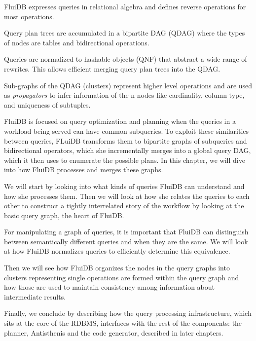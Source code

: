 
\begin{summary}
\item FluiDB expresses queries in relational algebra and defines
  reverse operations for most operations.
\item Query plan trees are accumulated in a bipartite DAG (QDAG) where
  the types of nodes are tables and bidirectional operations.
\item Queries are normalized to hashable objects (QNF) that abstract a
  wide range of rewrites. This allows efficient merging query plan
  trees into the QDAG.
\item Sub-graphs of the QDAG (clusters) represent higher level
  operations and are used as \emph{propagators} to infer information
  of the n-nodes like cardinality, column type, and uniqueness of
  subtuples.
\end{summary}

FluiDB is focused on query optimization and planning when the queries
in a workload being served can have common subqueries.  To exploit
these similarities between queries, FLuiDB transforms them to
bipartite graphs of subqueries and bidirectional operators, which she
incrementally merges into a global query DAG, which it then uses to
enumerate the possible plans.  In this chapter, we will dive into how
FluiDB processes and merges these graphs.

We will start by looking into what kinds of queries FluiDB can
understand and how she processes them. Then we will look at how she
relates the queries to each other to construct a tightly interrelated
story of the workflow by looking at the basic query graph, the heart
of FluiDB.

For manipulating a graph of queries, it is important that FluiDB can
distinguish between semantically different queries and when they are
the same.  We will look at how FluiDB normalizes queries to
efficiently determine this equivalence.

Then we will see how FluiDB organizes the nodes in the query graphs
into clusters representing single operations are formed within the
query graph and how those are used to maintain consistency among
information about intermediate results.

Finally, we conclude by describing how the query processing
infrastructure, which sits at the core of the RDBMS, interfaces with
the rest of the components: the planner, Antisthenis and the code
generator, described in later chapters.

